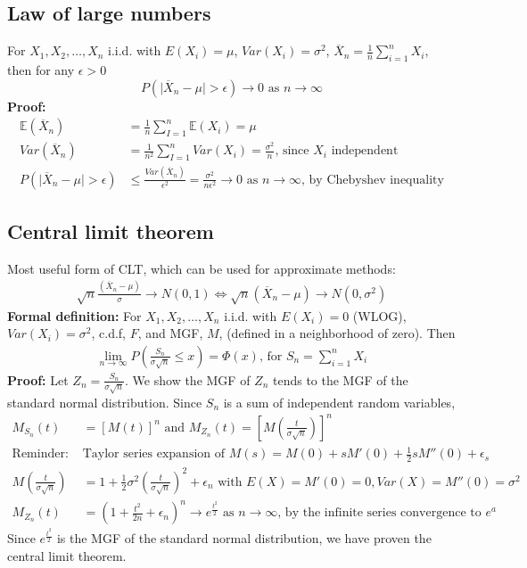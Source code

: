 \documentclass{article}
\newcommand{\abs}[1]{\lvert#1\rvert}
\begin{document}
\subsection{Law of large numbers}
For $X_1, X_2, \dots, X_n$ i.i.d. with $E(X_i) = \mu$,  $Var(X_i) = \sigma^2$, $\overline{X}_n = \frac{1}{n}\sum_{i = 1}^n X_i$, then for any $\epsilon > 0$
\begin{equation*}
	P(\abs{\overline{X}_n - \mu} > \epsilon) \longrightarrow 0 \textrm{ as } n \rightarrow \infty
\end{equation*}
\textbf{Proof:}
\begin{align*}
	\mathbb{E}(\overline{X}_n) &= \frac{1}{n}\sum_{I = 1}^n \mathbb{E}(X_i) = \mu\\
    Var(\overline{X}_n) &= \frac{1}{n^2}\sum_{I = 1}^nVar(X_i) = \frac{\sigma^2}{n} \textrm{, since $X_i$ independent}\\
    P(\abs{\overline{X}_n - \mu} > \epsilon) &\leq \frac{Var(\overline{X}_n)}{\epsilon^2} = \frac{\sigma^2}{n\epsilon^2} \rightarrow 0 \textrm{ as } n \rightarrow \infty \textrm{, by Chebyshev inequality}
\end{align*}

\subsection{Central limit theorem}
Most useful form of CLT, which can be used for approximate methods:
\begin{align*}
	\sqrt{n}\frac{(\overline{X}_n - \mu)}{\sigma} \longrightarrow N(0, 1) \Longleftrightarrow \sqrt{n}(\overline{X}_n - \mu) \longrightarrow N(0, \sigma^2)
\end{align*}
\textbf{Formal definition:} For $X_1, X_2, \dots, X_n$ i.i.d. with $E(X_i) = 0$ (WLOG),  $Var(X_i) = \sigma^2$, c.d.f, $F$, and MGF, $M$, (defined in a neighborhood of zero). Then
\begin{align*}
	\lim_{n \rightarrow \infty}P(\frac{S_n}{\sigma \sqrt{n}} \leq x) = \Phi(x) \textrm{, for } S_n = \sum_{i=1}^nX_i
\end{align*}
\textbf{Proof:} Let $Z_n  = \frac{S_n}{\sigma \sqrt{n}}$. We show the MGF of $Z_n$ tends to the MGF of the standard normal distribution. Since $S_n$ is a sum of independent random variables,
\begin{align*}
	M_{S_n}(t) &= [M(t)]^n \textrm{ and } M_{Z_n}(t) = [M(\frac{t}{\sigma \sqrt{n}})]^n\\
	\textrm{Reminder: } & \textrm{Taylor series expansion of } M(s) = M(0)+sM'(0)+ \frac{1}{2}sM''(0) + \epsilon_s \\
	M(\frac{t}{\sigma\sqrt{n}}) &= 1 + \frac{1}{2}\sigma^2(\frac{t}{\sigma \sqrt{n}})^2 + \epsilon_n \textrm{ with } E(X) = M'(0) = 0, Var(X) = M''(0) = \sigma^2\\
	M_{Z_n}(t) &= (1 + \frac{t^2}{2n} + \epsilon_n)^n \longrightarrow e^{\frac{t^2}{2}} \textrm{ as } n \longrightarrow \infty \textrm{, by the infinite series convergence to $e^a$}
\end{align*}
Since $e^{\frac{t^2}{2}}$ is the MGF of the standard normal distribution, we have proven the central limit theorem.
\end{document}
